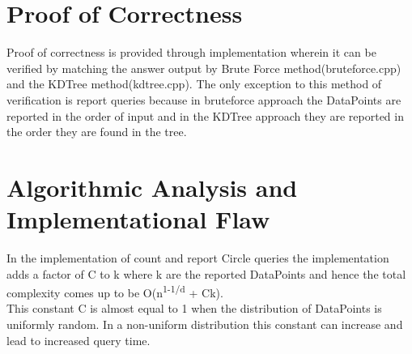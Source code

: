 \documentclass[11pt]{article}
\begin{document}
\section{Proof of Correctness}
Proof of correctness is provided through implementation wherein it can be verified by matching the answer output by Brute Force method(bruteforce.cpp) and the KDTree method(kdtree.cpp).
The only exception to this method of verification is report queries because in bruteforce approach the DataPoints are reported in the order of input and in the KDTree approach they are reported in the order they are found in the tree.

\section{Algorithmic Analysis and Implementational Flaw}
In the implementation of count and report Circle queries the implementation adds a factor of C to k where k are the reported DataPoints and hence the total complexity comes up to be O(n\textsuperscript{1-1/d} + Ck).\\
\indent This constant C is almost equal to 1 when the distribution of DataPoints is uniformly random. In a non-uniform distribution this constant can increase and lead to increased query time.
\end{document}
